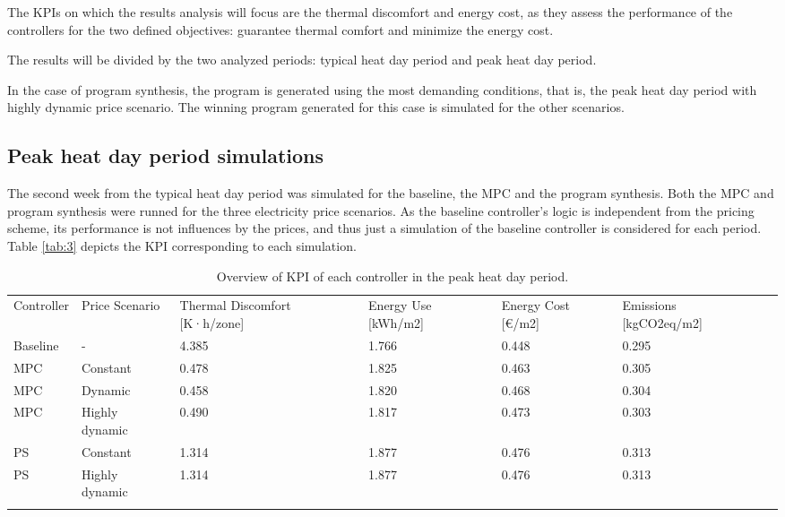The KPIs on which the results analysis will focus are the thermal discomfort and energy cost, as they assess the performance of the controllers for the two defined objectives: guarantee thermal comfort and minimize the energy cost.

The results will be divided by the two analyzed periods: typical heat day period and peak heat day period.

In the case of program synthesis, the program is generated using the most demanding conditions, that is, the peak heat day period with highly dynamic price scenario. The winning program generated for this case is simulated for the other scenarios.

\newpage
\subsection{Peak heat day period simulations}
\label{'results_peak'}
The second week from the typical heat day period was simulated for the baseline, the MPC and the program synthesis. Both the MPC and program synthesis were runned for the three electricity price scenarios. As the baseline controller's logic is independent from the pricing scheme, its performance is not influences by the prices, and thus just a simulation of the baseline controller is considered for each period. Table \ref{tab:3} depicts the KPI corresponding to each simulation.

\begin{table}
    \caption{Overview of KPI of each controller in the peak heat day period.}
    \label{tab:2}
    
    \centering
    \begin{tabular}{lllllll}
        \hline
        \noalign{\smallskip}
        Controller & Price Scenario & Thermal Discomfort [K·h/zone] & Energy Use [kWh/m2] & Energy Cost [€/m2] & Emissions [kgCO2eq/m2] \\
        \noalign{\smallskip}
        \hline
        \noalign{\smallskip}
        Baseline & - & 4.385 & 1.766 & 0.448 & 0.295 \\
        MPC & Constant & 0.478 & 1.825 & 0.463 & 0.305 \\
        MPC & Dynamic & 0.458 & 1.820 & 0.468 & 0.304 \\
        MPC & Highly dynamic & 0.490 & 1.817 & 0.473 & 0.303 \\
        PS & Constant & 1.314 & 1.877 & 0.476 & 0.313 \\
        PS & Highly dynamic & 1.314 & 1.877 & 0.476 & 0.313 \\
        \noalign{\smallskip}
        \hline
    \end{tabular}
\end{table}

